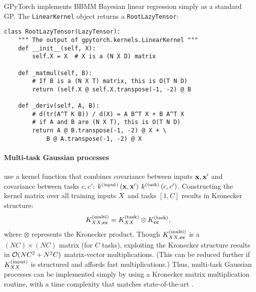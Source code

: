 GPyTorch implements BBMM Bayesian linear regression simply as a standard GP.
The {\tt LinearKernel} object returns a {\tt RootLazyTensor}:
%
\begin{verbatim}
class RootLazyTensor(LazyTensor):
    """ The output of gpytorch.kernels.LinearKernel """
    def __init__(self, X):
        self.X = X  # X is a (N X D) matrix

    def _matmul(self, B):
        # If B is a (N X T) matrix, this is O(T N D)
        return (self.X @ self.X.transpose(-1, -2) @ B

    def _deriv(self, A, B):
        # d(tr(A^T K B)) / d(X) = A B^T X + B A^T X
        # if A and B are (N X T), this is O(T N D)
        return A @ B.transpose(-1, -2) @ X + \
            B @ A.transpose(-1, -2) @ X
\end{verbatim}

\paragraph{Multi-task Gaussian processes} \cite{bonilla2008multi} use a kernel function that combines covariance between inputs $\mathbf{x}, \mathbf{x}'$ and covariance between tasks $c, c'$:
$k^{(\text{input})} \left( \mathbf{x}, \mathbf{x}' \right) \: k^{(\text{task})} \left( c, c' \right)$.
Constructing the kernel matrix over all training inputs $X$ and tasks $[1, C]$ results in Kronecker structure:
%
\[
  K_{XX, \mathbf{c}\mathbf{c}}^{(\text{multi})} = K^{(\text{task})}_{XX} \otimes K^{(\text{task})}_{\mathbf{c}\mathbf{c}},
\]
%
where $\otimes$ represents the Kronecker product.
Though $K_{XX, \mathbf{c}\mathbf{c}}^{(\text{multi})}$ is a $(NC) \times (NC)$ matrix (for $C$ tasks), exploiting the Kronecker structure results in $\bigo{N C^2 + N^2 C}$ matrix-vector multiplications.
(This can be reduced further if $K^{(\text{input})}_{XX}$ is structured and affords fast multiplications.)
Thus, multi-task Gaussian processes can be implemented simply by using a Kronecker matrix multiplication routine, with a time complexity that matches state-of-the-art \citep{bonilla2008multi}.

